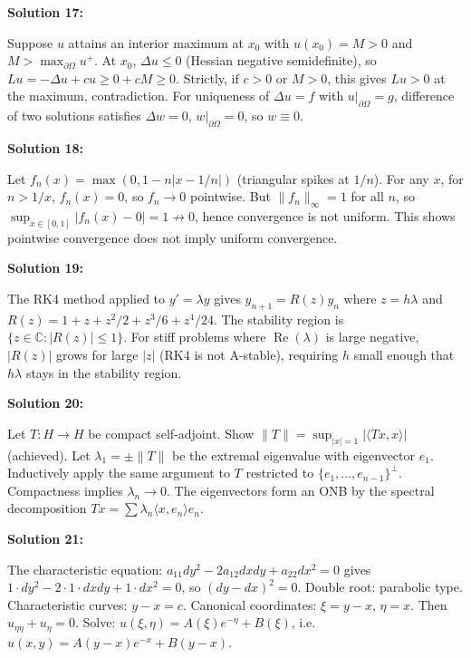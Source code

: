 \documentclass[12pt,a4paper]{exam}
\begin{document}
\vspace{0.5cm}

\textbf{Solution 17:}

Suppose $u$ attains an interior maximum at $x_0$ with $u(x_0) = M > 0$ and $M > \max_{\partial\Omega} u^+$. At $x_0$, $\Delta u \leq 0$ (Hessian negative semidefinite), so $Lu = -\Delta u + c u \geq 0 + cM \geq 0$. Strictly, if $c>0$ or $M>0$, this gives $Lu > 0$ at the maximum, contradiction. For uniqueness of $\Delta u = f$ with $u|_{\partial\Omega} = g$, difference of two solutions satisfies $\Delta w = 0$, $w|_{\partial\Omega} = 0$, so $w \equiv 0$.

\vspace{0.5cm}

\textbf{Solution 18:}

Let $f_n(x) = \max(0, 1 - n|x - 1/n|)$ (triangular spikes at $1/n$). For any $x$, for $n > 1/x$, $f_n(x) = 0$, so $f_n \to 0$ pointwise. But $\|f_n\|_\infty = 1$ for all $n$, so $\sup_{x \in [0,1]} |f_n(x) - 0| = 1 \not\to 0$, hence convergence is not uniform. This shows pointwise convergence does not imply uniform convergence.

\vspace{0.5cm}

\textbf{Solution 19:}

The RK4 method applied to $y' = \lambda y$ gives $y_{n+1} = R(z) y_n$ where $z = h\lambda$ and $R(z) = 1 + z + z^2/2 + z^3/6 + z^4/24$. The stability region is $\{z \in \mathbb{C}: |R(z)| \leq 1\}$. For stiff problems where $\operatorname{Re}(\lambda)$ is large negative, $|R(z)|$ grows for large $|z|$ (RK4 is not A-stable), requiring $h$ small enough that $h\lambda$ stays in the stability region.

\vspace{0.5cm}

\textbf{Solution 20:}

Let $T: H \to H$ be compact self-adjoint. Show $\|T\| = \sup_{|x|=1} |\langle Tx, x \rangle|$ (achieved). Let $\lambda_1 = \pm\|T\|$ be the extremal eigenvalue with eigenvector $e_1$. Inductively apply the same argument to $T$ restricted to $\{e_1,\ldots,e_{n-1}\}^\perp$. Compactness implies $\lambda_n \to 0$. The eigenvectors form an ONB by the spectral decomposition $Tx = \sum \lambda_n \langle x, e_n \rangle e_n$.

\vspace{0.5cm}

\textbf{Solution 21:}

The characteristic equation: $a_{11} dy^2 - 2a_{12} dx dy + a_{22} dx^2 = 0$ gives $1\cdot dy^2 - 2\cdot1\cdot dx dy + 1\cdot dx^2 = 0$, so $(dy - dx)^2 = 0$. Double root: parabolic type. Characteristic curves: $y - x = c$. Canonical coordinates: $\xi = y - x$, $\eta = x$. Then $u_{\eta\eta} + u_\eta = 0$. Solve: $u(\xi,\eta) = A(\xi) e^{-\eta} + B(\xi)$, i.e. $u(x,y) = A(y-x) e^{-x} + B(y-x)$.
\end{document}
